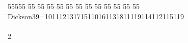 %
%
\begin{tabbing}
55555 \= 55 \= 55 \= 55 \= 55 \= 55 \= 55 \= 55 \= 55 \= 55 \= 55 \= 55 \= 55 \= \>Dickson39=101112131715110161131811119114112115119\\[0pt]
\>\\[0pt]
2\>\end{tabbing}
